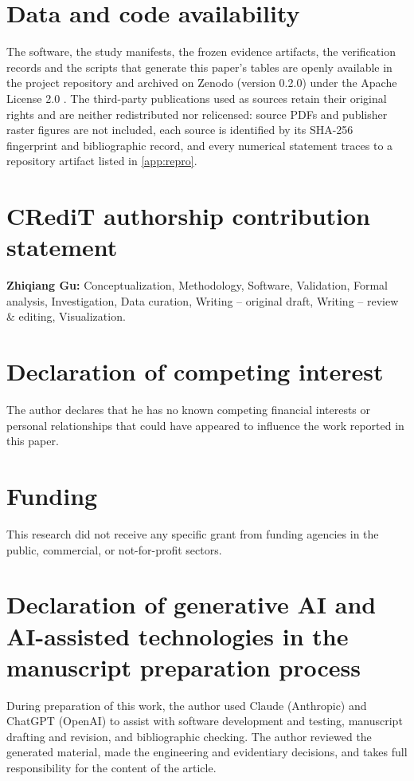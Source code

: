 
\section*{Data and code availability}
The \engiproof{} software, the study manifests, the frozen evidence artifacts, the verification records and the scripts that generate this paper's tables are openly available in the project repository and archived on Zenodo (version 0.2.0) under the Apache License 2.0 \cite{EngiProof2026}. The third-party publications used as sources retain their original rights and are neither redistributed nor relicensed: source PDFs and publisher raster figures are not included, each source is identified by its SHA-256 fingerprint and bibliographic record, and every numerical statement traces to a repository artifact listed in \ref{app:repro}.

\section*{CRediT authorship contribution statement}
\textbf{Zhiqiang Gu:} Conceptualization, Methodology, Software, Validation, Formal analysis, Investigation, Data curation, Writing -- original draft, Writing -- review \& editing, Visualization.

\section*{Declaration of competing interest}
The author declares that he has no known competing financial interests or personal relationships that could have appeared to influence the work reported in this paper.

\section*{Funding}
This research did not receive any specific grant from funding agencies in the public, commercial, or not-for-profit sectors.

\section*{Declaration of generative AI and AI-assisted technologies in the manuscript preparation process}
During preparation of this work, the author used Claude (Anthropic) and ChatGPT (OpenAI) to assist with software development and testing, manuscript drafting and revision, and bibliographic checking. The author reviewed the generated material, made the engineering and evidentiary decisions, and takes full responsibility for the content of the article.
